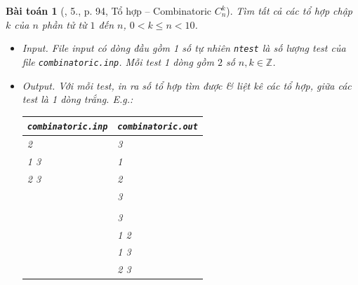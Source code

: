 \documentclass{article}
\newtheorem{baitoan}{Bài toán}
\begin{document}
\begin{baitoan}[\cite{VietSTEM2021}, 5., p. 94, Tổ hợp -- Combinatoric $C_n^k$]
	Tìm tất cả các tổ hợp chập $k$ của $n$ phần tử từ $1$ đến $n$, $0 < k\le n < 10$.
	\begin{itemize}
		\item {\sf Input.} File input có dòng đầu gồm 1 số tự nhiên \texttt{ntest} là số lượng test của file \verb|combinatoric.inp|. Mỗi test 1 dòng gồm $2$ số $n,k\in\mathbb{Z}$. 
		\item {\sf Output.} Với mỗi test, in ra số tổ hợp tìm được \& liệt kê các tổ hợp, giữa các test là 1 dòng trắng. E.g.:
		\begin{table}[H]
			\centering
			\begin{tabular}{|l|l|}
				\hline
				\texttt{combinatoric.inp} & \texttt{combinatoric.out} \\
				\hline
				2 & 3 \\
				1 3 & 1 \\
				2 3 & 2 \\
				& 3 \\
				& \\
				& 3 \\
				& 1 2 \\
				& 1 3 \\
				& 2 3 \\
				\hline
			\end{tabular}
		\end{table}
	\end{itemize}
\end{baitoan}
\end{document}
